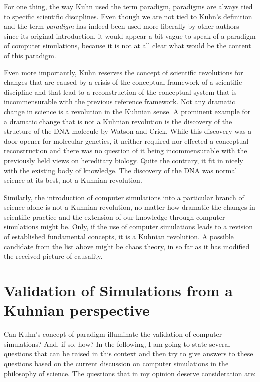 \documentclass[12pt, a4paper]{article}
\begin{document}
For one thing, the way Kuhn used the term paradigm, paradigms are
always tied to specific scientific disciplines. Even though we are not
tied to Kuhn's definition and the term {\em paradigm} has indeed been
used more liberally by other authors since its original introduction,
it would appear a bit vague to speak of a paradigm of computer
simulations, because it is not at all clear what would be the content
of this paradigm.

Even more importantly, Kuhn reserves the concept of scientific
revolutions for changes that are caused by a crisis of the conceptual
framework of a scientific discipline and that lead to a reconstruction
of the conceptual system that is incommensurable with the previous
reference framework. Not any dramatic change in science is a
revolution in the Kuhnian sense. A prominent example for a dramatic
change that is not a Kuhnian revolution is the discovery of the
structure of the DNA-molecule by Watson and Crick. While this
discovery was a door-opener for molecular genetics, it neither
required nor effected a conceptual reconstruction and there was no
question of it being incommensurable with the previously held views on
hereditary biology. Quite the contrary, it fit in nicely with the
existing body of knowledge. The discovery of the DNA was normal
science at its best, not a Kuhnian revolution.

Similarly, the introduction of computer simulations into a particular
branch of science alone is not a Kuhnian revolution, no matter how
dramatic the changes in scientific practice and the extension of our
knowledge through computer simulations might be. Only, if the use of
computer simulations leads to a revision of established fundamental
concepts, it is a Kuhnian revolution. A possible candidate from the
list above might be chaos theory, in so far as it has modified the
received picture of causality.


\section{Validation of Simulations from a Kuhnian perspective}

\label{sec:val}

Can Kuhn's concept of paradigm illuminate the validation of computer
simulations? And, if so, how? In the following, I am going to state
several questions that can be raised in this context and then try to
give answers to these questions based on the current discussion on
computer simulations in the philosophy of science. The questions that
in my opinion deserve consideration are:
\end{document}
